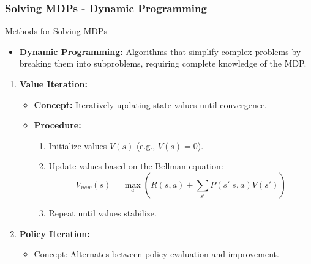 \documentclass[aspectratio=169]{beamer}
\begin{document}
\begin{frame}[fragile]
    \frametitle{Solving MDPs - Dynamic Programming}
    \begin{block}{Methods for Solving MDPs}
        \begin{itemize}
            \item \textbf{Dynamic Programming:} Algorithms that simplify complex problems by breaking them into subproblems, requiring complete knowledge of the MDP.
        \end{itemize}
    \end{block}

    \begin{enumerate}
        \item \textbf{Value Iteration:}
            \begin{itemize}
                \item \textbf{Concept:} Iteratively updating state values until convergence.
                \item \textbf{Procedure:}
                    \begin{enumerate}
                        \item Initialize values \( V(s) \) (e.g., \( V(s)=0 \)).
                        \item Update values based on the Bellman equation:
                        \begin{equation}
                        V_{new}(s) = \max_{a} \left( R(s, a) + \sum_{s'} P(s'|s, a) V(s') \right)
                        \end{equation}
                        \item Repeat until values stabilize.
                    \end{enumerate}
            \end{itemize}
        \item \textbf{Policy Iteration:}
            \begin{itemize}
                \item Concept: Alternates between policy evaluation and improvement.
            \end{itemize}
    \end{enumerate}
\end{frame}
\end{document}
